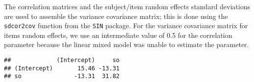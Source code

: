 \documentclass[12pt,]{krantz}
\newenvironment{Shaded}{\begin{snugshade}}{\end{snugshade}}
\newcommand{\CommentTok}[1]{\textcolor[rgb]{0.56,0.35,0.01}{\textit{#1}}}
\newcommand{\DataTypeTok}[1]{\textcolor[rgb]{0.13,0.29,0.53}{#1}}
\newcommand{\DecValTok}[1]{\textcolor[rgb]{0.00,0.00,0.81}{#1}}
\newcommand{\KeywordTok}[1]{\textcolor[rgb]{0.13,0.29,0.53}{\textbf{#1}}}
\newcommand{\NormalTok}[1]{#1}
\newcommand{\OperatorTok}[1]{\textcolor[rgb]{0.81,0.36,0.00}{\textbf{#1}}}
\newcommand{\StringTok}[1]{\textcolor[rgb]{0.31,0.60,0.02}{#1}}
\begin{document}
The correlation matrices and the subject/item random effects standard deviations are used to assemble the variance covariance matrix; this is done using the \texttt{sdcor2cov} function from the \texttt{SIN} package. For the variance covariance matrix for items random effects, we use an intermediate value of 0.5 for the correlation parameter because the linear mixed model was unable to estimate the parameter.

\begin{Shaded}
\end{Shaded}

\begin{verbatim}
##             (Intercept)     so
## (Intercept)       15.46 -13.31
## so               -13.31  31.82
\end{verbatim}
\end{document}
